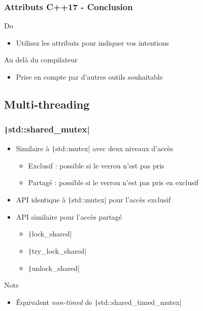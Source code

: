 \documentclass[C++.tex]{subfiles}
\begin{document}
\begin{frame}[fragile]
	\frametitle{Attributs C++17 - Conclusion}
	\begin{exampleblock}{Do}
		\begin{itemize}
			\item Utilisez les attributs pour indiquer vos intentions
		\end{itemize}

	\end{exampleblock}

	\begin{block}{Au delà du compilateur}
		\begin{itemize}
			\item Prise en compte par d'autres outils souhaitable
		\end{itemize}
	\end{block}
\end{frame}

\subsection*{Multi-threading}
\begin{frame}[fragile]
	\frametitle{\texttt|std::shared_mutex|}
	\begin{itemize}
		\item Similaire à \texttt|std::mutex| avec deux niveaux d'accès
		\begin{itemize}
			\item Exclusif : possible si le verrou n'est pas pris
			\item Partagé : possible si le verrou n'est pas pris en exclusif
		\end{itemize}
		\item API identique à \texttt|std::mutex| pour l'accès exclusif
		\item API similaire pour l'accès partagé
		\begin{itemize}
			\item \texttt|lock_shared|
			\item \texttt|try_lock_shared|
			\item \texttt|unlock_shared|
		\end{itemize}
	\end{itemize}

	\begin{block}{Note}
		\begin{itemize}
			\item Équivalent \textit{non-timed} de \texttt|std::shared_timed_mutex|
		\end{itemize}
	\end{block}
\end{frame}
\end{document}
